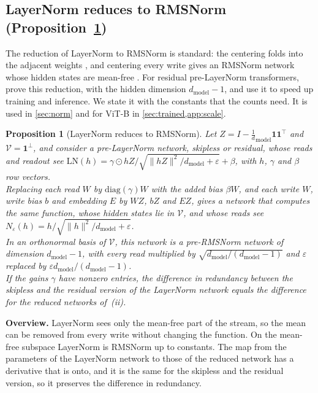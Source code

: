 \documentclass[10pt]{article}
\newtheorem{proposition}[theorem]{Proposition}
\theoremstyle{definition}
\theoremstyle{remark}
\newcommand{\dm}{d_{\mathrm{model}}}
\newcommand{\norm}[1]{\lVert #1\rVert}
\newcommand{\para}[1]{\smallskip\noindent\textbf{#1}\hspace{0.5em}}
\newcommand{\ptlabel}[1]{\phantomsection\label{#1}}
\newcommand{\stpart}[3]{\ifx\relax#1\relax\else\ptlabel{#1:#2}\fi{\upshape\bfseries\boldmath(#2)\ifx\relax#3\relax\else\ #3.\fi}}
\begin{document}
\subsection{LayerNorm reduces to RMSNorm\texorpdfstring{ (Proposition~\ref*{prop:ln})}{}}\label{app:ln}

The reduction of LayerNorm to RMSNorm is standard: the centering folds into the adjacent weights \citep{elhage2021circuits}, and centering every write gives an RMSNorm network whose hidden states are mean-free \citep{ashkboos2024slicegpt,theus2025glmc}. For residual pre-LayerNorm transformers, \citet{jiang2023prermsnorm} prove this reduction, with the hidden dimension $\dm - 1$, and use it to speed up training and inference. We state it with the constants that the counts need. It is used in \cref{sec:norm} and for ViT-B in \cref{sec:trained,app:scale}.

\begin{proposition}[LayerNorm reduces to RMSNorm]\label{prop:ln}
Let $Z = I - \tfrac1\dm\mathbf 1\mathbf 1^\top$ and $\mathcal V = \mathbf 1^\perp$, and consider a pre-LayerNorm network, skipless or residual, whose reads and readout see $\mathrm{LN}(h) = \gamma\odot hZ/\sqrt{\norm{hZ}^2/\dm + \varepsilon} + \beta$, with $h$, $\gamma$ and $\beta$ row vectors.\\
\stpart{}{i}{} Replacing each read $W$ by $\mathrm{diag}(\gamma)W$ with the added bias $\beta W$, and each write $W$, write bias $b$ and embedding $E$ by $WZ$, $bZ$ and $EZ$, gives a network that computes the same function, whose hidden states lie in $\mathcal V$, and whose reads see $N_\varepsilon(h) = h/\sqrt{\norm{h}^2/\dm + \varepsilon}$.\\
\stpart{}{ii}{} In an orthonormal basis of $\mathcal V$, this network is a pre-RMSNorm network of dimension $\dm-1$, with every read multiplied by $\sqrt{\dm/(\dm-1)}$ and $\varepsilon$ replaced by $\varepsilon \dm/(\dm-1)$.\\
\stpart{}{iii}{} If the gains $\gamma$ have nonzero entries, the difference in redundancy between the skipless and the residual version of the LayerNorm network equals the difference for the reduced networks of~(ii).
\end{proposition}

\para{Overview.} LayerNorm sees only the mean-free part of the stream, so the mean can be removed from every write without changing the function. On the mean-free subspace LayerNorm is RMSNorm up to constants. The map from the parameters of the LayerNorm network to those of the reduced network has a derivative that is onto, and it is the same for the skipless and the residual version, so it preserves the difference in redundancy.
\end{document}

